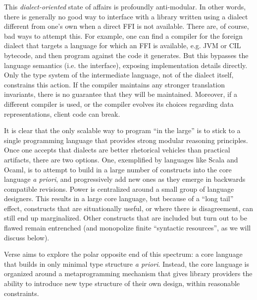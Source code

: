 \documentclass[preprint]{sigplanconf}
\newcommand{\Verse}{{\textsf{\small Verse}}}
\begin{document}
This \emph{dialect-oriented} state of affairs is profoundly anti-modular. %
In other words, there is generally no good way to interface with a library written using a dialect different from one's own when a direct FFI is not available. There are, of course, bad ways to attempt  this. For example, one can find a compiler for the foreign dialect that targets a language for which an FFI is available, e.g. JVM or CIL bytecode, and then program against the code it generates. But this bypasses the language semantics (i.e. the interface), exposing implementation details directly. Only the type system of the intermediate language, not of the dialect itself, constrains this action. If the compiler maintains any stronger translation invariants, there is  no guarantee that they will be maintained. Moreover, if a different compiler is used, or the  compiler evolves its choices regarding data representations, client code can break. %

It is clear that the only scalable way to program ``in the large'' is to stick to a single programming language that provides strong modular reasoning principles. Once one accepts that dialects are better rhetorical vehicles than practical artifacts, there are two options. One, exemplified by languages like Scala and Ocaml, is to attempt to build in a large number of constructs into the core language \emph{a priori}, and progressively add new ones as they emerge in backwards compatible revisions. Power is centralized around a small group of language designers. This results in a large core language, but because of a ``long tail'' effect, constructs that are situationally useful, or where there is  disagreement, can still end up marginalized. Other constructs that are included but turn out to be  flawed remain entrenched (and monopolize finite ``syntactic resources'', as we will discuss below).

{\Verse} aims to explore the polar opposite end of this spectrum: a core language that builds in only minimal type structure \emph{a priori}. Instead, the core language is organized around a metaprogramming mechanism that gives library providers the ability to introduce new type structure of their own design, within reasonable constraints. 
\end{document}

